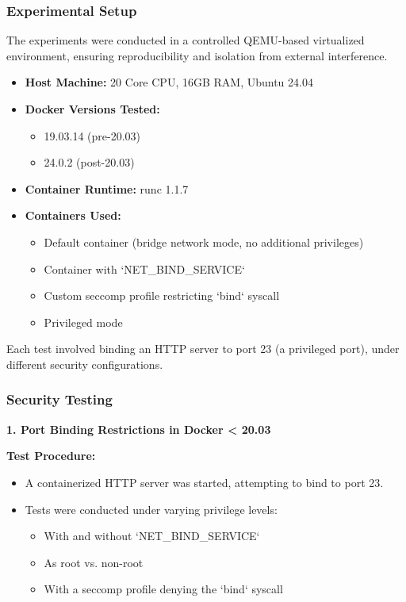 \subsubsection{Experimental Setup}
The experiments were conducted in a controlled QEMU-based virtualized environment, ensuring reproducibility and isolation from external interference.

\begin{itemize}
    \item \textbf{Host Machine:} 20 Core CPU, 16GB RAM, Ubuntu 24.04
    \item \textbf{Docker Versions Tested:}  
        \begin{itemize}
            \item 19.03.14 (pre-20.03)
            \item 24.0.2 (post-20.03)
        \end{itemize}
    \item \textbf{Container Runtime:} runc 1.1.7
    \item \textbf{Containers Used:}  
        \begin{itemize}
            \item Default container (bridge network mode, no additional privileges)
            \item Container with `NET\_BIND\_SERVICE`
            \item Custom seccomp profile restricting `bind` syscall
            \item Privileged mode
        \end{itemize}
\end{itemize}

Each test involved binding an HTTP server to port 23 (a privileged port), under different security configurations.

\subsubsection{Security Testing}

\noindent\textbf{1. Port Binding Restrictions in Docker < 20.03}

\textbf{Test Procedure:}
\begin{itemize}
    \item A containerized HTTP server was started, attempting to bind to port 23.
    \item Tests were conducted under varying privilege levels:
        \begin{itemize}
            \item With and without `NET\_BIND\_SERVICE`
            \item As root vs. non-root
            \item With a seccomp profile denying the `bind` syscall
        \end{itemize}
\end{itemize}

